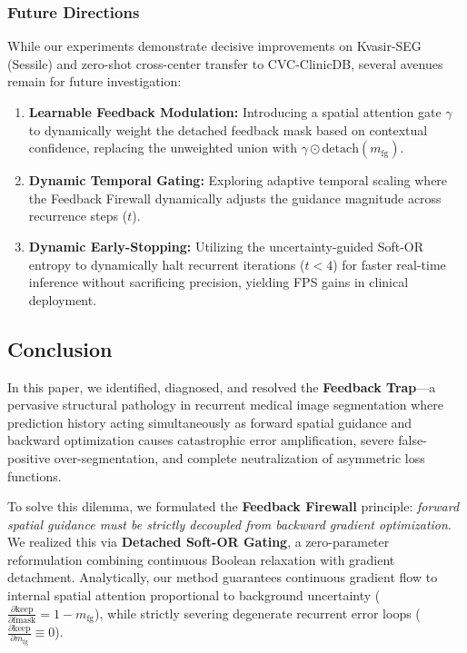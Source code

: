 \subsubsection{Future Directions}
While our experiments demonstrate decisive improvements on Kvasir-SEG
(Sessile) and zero-shot cross-center transfer to CVC-ClinicDB, several
avenues remain for future investigation:
\begin{enumerate}
  \item \textbf{Learnable Feedback Modulation:}
        Introducing a spatial attention gate $\gamma$ to dynamically
        weight the detached feedback mask based on contextual
        confidence, replacing the unweighted union with
        $\gamma \odot \text{detach}(m_{\text{fg}})$.
  \item \textbf{Dynamic Temporal Gating:}
        Exploring adaptive temporal scaling where the Feedback Firewall
        dynamically adjusts the guidance magnitude across recurrence steps ($t$).
  \item \textbf{Dynamic Early-Stopping:}
        Utilizing the uncertainty-guided Soft-OR entropy to dynamically
        halt recurrent iterations ($t < 4$) for faster real-time
        inference without sacrificing precision, yielding FPS gains in
        clinical deployment.
\end{enumerate}

\subsection{Conclusion}
In this paper, we identified, diagnosed, and resolved the \textbf{Feedback Trap}---a
pervasive structural pathology in recurrent medical image segmentation where
prediction history acting simultaneously as forward spatial guidance and backward
optimization causes catastrophic error amplification, severe false-positive
over-segmentation, and complete neutralization of asymmetric loss functions.

To solve this dilemma, we formulated the \textbf{Feedback Firewall} principle:
\textit{forward spatial guidance must be strictly decoupled from backward gradient optimization}.
We realized this via \textbf{Detached Soft-OR Gating}, a zero-parameter reformulation
combining continuous Boolean relaxation with gradient detachment. Analytically,
our method guarantees continuous gradient flow to internal spatial attention
proportional to background uncertainty ($\frac{\partial \text{keep}}{\partial \text{fmask}} = 1 - m_{\text{fg}}$),
while strictly severing degenerate recurrent error loops ($\frac{\partial \text{keep}}{\partial m_{\text{fg}}} \equiv 0$).

